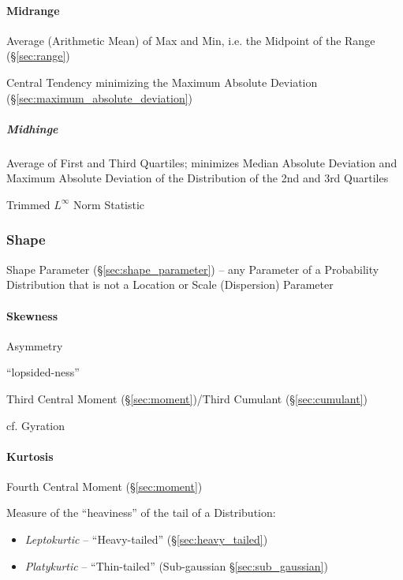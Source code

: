 \paragraph{Midrange}\label{sec:midrange}\hfill

Average (Arithmetic Mean) of Max and Min, i.e. the Midpoint of the Range
(\S\ref{sec:range})

Central Tendency minimizing the Maximum Absolute Deviation
(\S\ref{sec:maximum_absolute_deviation})



\subparagraph{Midhinge}\label{sec:midhinge}\hfill

Average of First and Third Quartiles; minimizes Median Absolute Deviation and
Maximum Absolute Deviation of the Distribution of the 2nd and 3rd Quartiles

Trimmed $L^\infty$ Norm Statistic



\subsubsection{Shape}\label{sec:distribution_shape}

\fist Shape Parameter (\S\ref{sec:shape_parameter}) -- any Parameter of a
Probability Distribution that is not a Location or Scale (Dispersion) Parameter



\paragraph{Skewness}\label{sec:skewness}\hfill

Asymmetry %

``lopsided-ness''

Third Central Moment (\S\ref{sec:moment})/Third Cumulant (\S\ref{sec:cumulant})

cf. Gyration



\paragraph{Kurtosis}\label{sec:kurtosis}\hfill

Fourth Central Moment (\S\ref{sec:moment})

Measure of the ``heaviness'' of the tail of a Distribution:

\begin{itemize}
  \item \emph{Leptokurtic} -- ``Heavy-tailed'' (\S\ref{sec:heavy_tailed})
  \item \emph{Platykurtic} -- ``Thin-tailed'' (Sub-gaussian
    \S\ref{sec:sub_gaussian})
\end{itemize}

